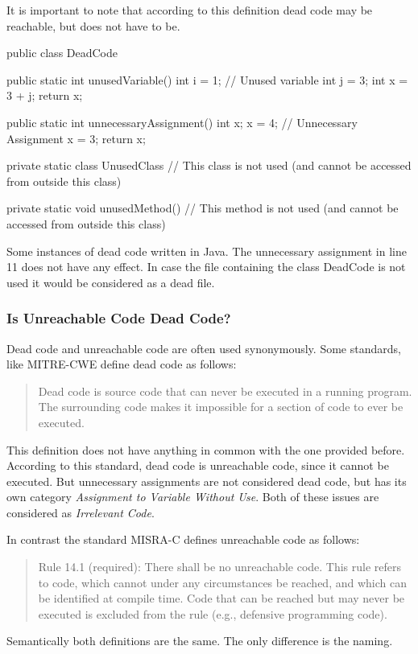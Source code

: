 It is important to note that according to this definition dead code may be reachable, but does not have to be.



\begin{program}
	\begin{JavaCode}
		public class DeadCode {
			public static int unusedVariable() {
				int i = 1; // Unused variable
				int j = 3;
				int x = 3 + j;
				return x;
			}
			
			public static int unnecessaryAssignment() {
				int x;
				x = 4; // Unnecessary Assignment
				x = 3;
				return x;
			}
			
			private static class UnusedClass {
				// This class is not used (and cannot be accessed from outside this class)
			}
			
			private static void unusedMethod() {
				// This method is not used (and cannot be accessed from outside this class)
			}
	}\end{JavaCode}
	\caption{Some instances of dead code written in Java. The unnecessary assignment in line 11 does not have any effect. In case the file containing the class DeadCode is not used it would be considered as a dead file.}
	\label{code:dead code}
\end{program}

\subsubsection{Is Unreachable Code Dead Code?}
Dead code and unreachable code are often used synonymously. 
Some standards, like MITRE-CWE \cite{CWECWE561Dead} define dead code as follows:
\begin{quote}
	Dead code is source code that can never be executed in a running program. The surrounding code makes it impossible for a section of code to ever be executed.
\end{quote}
This definition does not have anything in common with the one provided before. According to this standard, dead code is unreachable code, since it cannot be executed. But unnecessary assignments are not considered dead code, but has its own category \emph{Assignment to Variable Without Use}.
Both of these issues are considered as \emph{Irrelevant Code}.


In contrast the standard MISRA-C \cite{motorindustrysoftwarereliabilityassociationMISRAC2004Guidelines2008} defines unreachable code as follows:
\begin{quote}
	Rule 14.1 (required): There shall be no unreachable code.
	This  rule  refers  to  code,  which  cannot  under  any  circumstances  be  reached,  and  which  can  be 
	identified at compile time. Code that can be reached but may never be executed is excluded 
	from the rule (e.g., defensive programming code).	
\end{quote}
Semantically both definitions are the same. The only difference is the naming.



